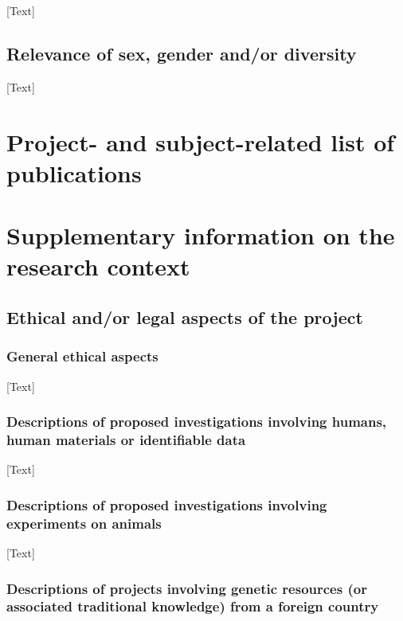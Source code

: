 [Text]

\subsection{Relevance of sex, gender and/or diversity}

[Text]

\section{Project- and subject-related list of publications}

\printbibliography[heading=none]

\section{Supplementary information on the research context}

\subsection{Ethical and/or legal aspects of the project}

\subsubsection{General ethical aspects}

[Text]

\subsubsection{Descriptions of proposed investigations involving humans, human materials or identifiable data}

[Text]

\subsubsection{Descriptions of proposed investigations involving experiments on animals}

[Text]

\subsubsection{Descriptions of projects involving genetic resources (or associated traditional knowledge) from a foreign country}

